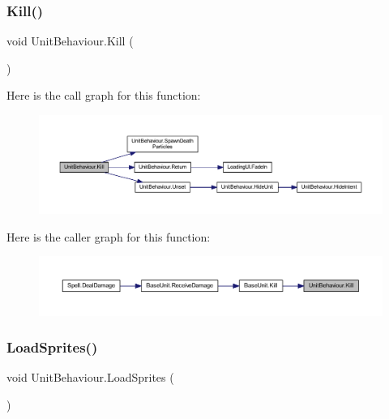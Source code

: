 \subsubsection{\texorpdfstring{Kill()}{Kill()}}
{\footnotesize\ttfamily void Unit\+Behaviour.\+Kill (\begin{DoxyParamCaption}{ }\end{DoxyParamCaption})}

Here is the call graph for this function\+:
\nopagebreak
\begin{figure}[H]
\begin{center}
\leavevmode
\includegraphics[width=350pt]{class_unit_behaviour_a9a32f3234ea6b89f686c6cd55d924348_cgraph}
\end{center}
\end{figure}
Here is the caller graph for this function\+:
\nopagebreak
\begin{figure}[H]
\begin{center}
\leavevmode
\includegraphics[width=350pt]{class_unit_behaviour_a9a32f3234ea6b89f686c6cd55d924348_icgraph}
\end{center}
\end{figure}
\mbox{\label{class_unit_behaviour_a544570d55168594c1e4502dbe5c9d6a8}} 
\subsubsection{\texorpdfstring{LoadSprites()}{LoadSprites()}}
{\footnotesize\ttfamily void Unit\+Behaviour.\+Load\+Sprites (\begin{DoxyParamCaption}{ }\end{DoxyParamCaption})}

